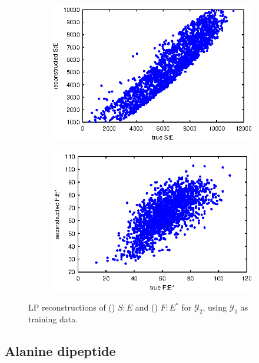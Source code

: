 \begin{figure}[t]
\centering
\begin{subfigure}{0.4\textwidth}
\includegraphics[width=\textwidth]{rxn_recon4}
\caption{}
\label{subfig:rxn_recon1}
\end{subfigure}
\begin{subfigure}{0.4\textwidth}
\includegraphics[width=\textwidth]{rxn_recon6}
\caption{}
\label{subfig:rxn_recon2}
\end{subfigure}
    \caption[Laplacian Pyramids reconstructions for chemical reaction network data]{LP reconstructions of () $S:E$ and () $F:E^{*}$ for $\mathcal{Y}_2$, using $\mathcal{Y}_1$ as training data.}
    \label{fig:rxn_recon}
\end{figure}

\subsection{Alanine dipeptide}


